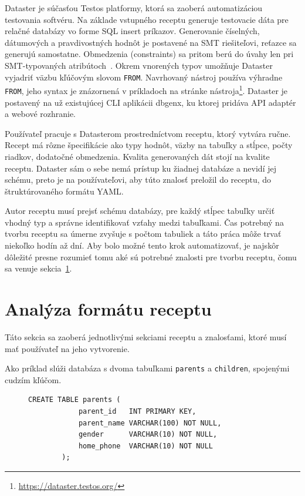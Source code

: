 Dataster je súčasťou Testos platformy, ktorá sa zaoberá automatizáciou testovania softvéru. Na základe vstupného receptu generuje testovacie dáta pre relačné databázy vo forme SQL insert príkazov. Generovanie číselných, dátumových a pravdivostných hodnôt je postavené na SMT riešiteľovi, reťazce sa generujú samostatne. Obmedzenia (constraints) sa pritom berú do úvahy len pri SMT-typovaných atribútoch~\cite{Vlach2020}. Okrem vnorených typov umožňuje Dataster vyjadriť väzbu kľúčovým slovom \texttt{FROM}. Navrhovaný nástroj používa výhradne \texttt{FROM}, jeho syntax je znázornená v príkladoch na stránke nástroja\footnote{\url{https://dataster.testos.org/}}. Dataster je postavený na už existujúcej CLI aplikácii dbgenx, ku ktorej pridáva API adaptér a webové rozhranie. 

Používateľ pracuje s Datasterom prostredníctvom receptu, ktorý vytvára ručne. Recept má rôzne špecifikácie ako typy hodnôt, väzby na tabuľky a stĺpce, počty riadkov, dodatočné obmedzenia. Kvalita generovaných dát stojí na kvalite receptu. Dataster sám o sebe nemá prístup ku žiadnej databáze a nevidí jej schému, preto je na používateľovi, aby túto znalosť preložil do receptu, do štruktúrovaného formátu YAML. 

Autor receptu musí prejsť schému databázy, pre každý stĺpec tabuľky určiť vhodný typ a správne identifikovať vzťahy medzi tabuľkami. Čas potrebný na tvorbu receptu sa úmerne zvyšuje s počtom tabuliek a táto práca môže trvať niekoľko hodín až dní. Aby bolo možné tento krok automatizovať, je najskôr dôležité presne rozumieť tomu aké sú potrebné znalosti pre tvorbu receptu, čomu sa venuje sekcia~\ref{sub:analyza_formatu_receptu}.



\section{Analýza formátu receptu}
\label{sub:analyza_formatu_receptu}

Táto sekcia sa zaoberá jednotlivými sekciami receptu a znalosťami, ktoré musí mať používateľ na jeho vytvorenie. 

Ako príklad slúži databáza s dvoma tabuľkami \texttt{parents} a \texttt{children}, spojenými cudzím kľúčom.

\begin{figure}[H]
    \centering
    \begin{lstlisting}[caption={Definícia tabuľky \texttt{parents}}, label={lst:parents}]
        CREATE TABLE parents (
            parent_id   INT PRIMARY KEY,
            parent_name VARCHAR(100) NOT NULL,
            gender      VARCHAR(10) NOT NULL,
            home_phone  VARCHAR(10) NOT NULL
        ); 
    \end{lstlisting}

   
    
\end{figure}


